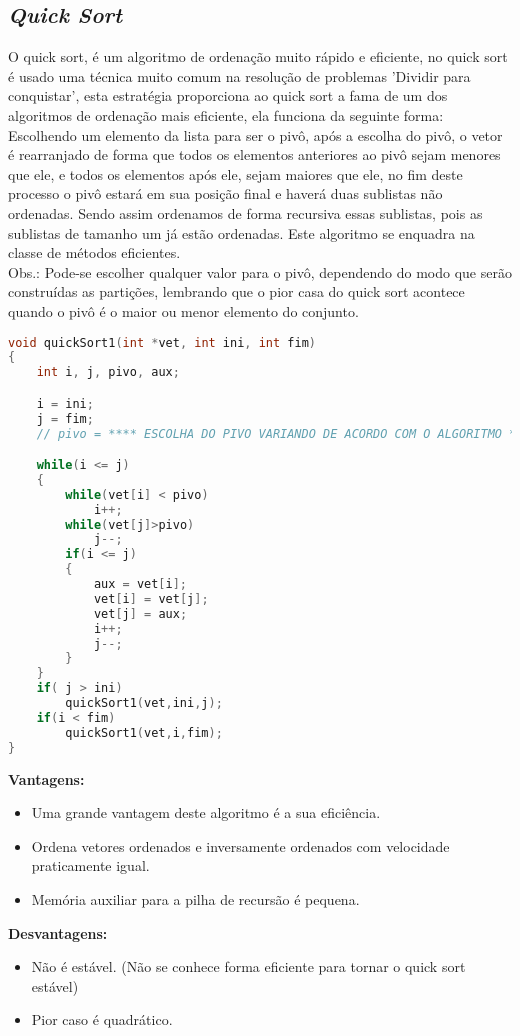 \documentclass[
	12pt,				%
	oneside,			%
	a4paper,			%
	english,			%
	brazil,				%
	]{article}
\begin{document}
\subsection{\textit{Quick Sort}}
O quick sort, é um algoritmo de ordenação muito rápido e eficiente, no quick sort é usado uma técnica muito comum na resolução de problemas 'Dividir para conquistar',
esta estratégia proporciona ao quick sort a fama de um dos algoritmos de ordenação mais eficiente, ela funciona da seguinte forma: Escolhendo um elemento da lista
para ser o pivô, após a escolha do pivô, o vetor é rearranjado de forma que todos os elementos anteriores ao pivô sejam menores que ele, e todos os elementos após ele,
sejam maiores que ele, no fim deste processo o pivô estará em sua posição final e haverá duas sublistas não ordenadas. Sendo assim ordenamos de forma recursiva essas sublistas,
pois as sublistas de tamanho um já estão ordenadas. Este algoritmo se enquadra na classe de métodos eficientes.
\\Obs.: Pode-se escolher qualquer valor para o pivô, dependendo do modo que serão construídas as partições, lembrando que o pior casa do quick sort acontece quando
o pivô é o maior ou menor elemento do conjunto.\cite{Quick} \cite{Quicksortt} \cite{Analise} \cite{Analiseee}

\begin{lstlisting}[language=C, caption=Estrutura \textit{Quick}]
void quickSort1(int *vet, int ini, int fim)
{
	int i, j, pivo, aux;

	i = ini;
	j = fim;
	// pivo = **** ESCOLHA DO PIVO VARIANDO DE ACORDO COM O ALGORITMO ****

	while(i <= j)
	{
		while(vet[i] < pivo)
			i++;
		while(vet[j]>pivo)
			j--;
		if(i <= j)
		{
			aux = vet[i];
			vet[i] = vet[j];
			vet[j] = aux;
			i++;
			j--;
		}
	}
	if( j > ini)
		quickSort1(vet,ini,j);
	if(i < fim)
		quickSort1(vet,i,fim);
}
\end{lstlisting}
\textbf{Vantagens:}
\begin{itemize}
 \item Uma grande vantagem deste algoritmo é a sua eficiência.
 \item Ordena vetores ordenados e inversamente ordenados com velocidade praticamente igual.
 \item Memória auxiliar para a pilha de recursão é pequena.
\end{itemize}
\textbf{Desvantagens:}
\begin{itemize}
 \item Não é estável. (Não se conhece forma eficiente para tornar o quick sort estável)
 \item Pior caso é quadrático.
\end{itemize}
\end{document}
